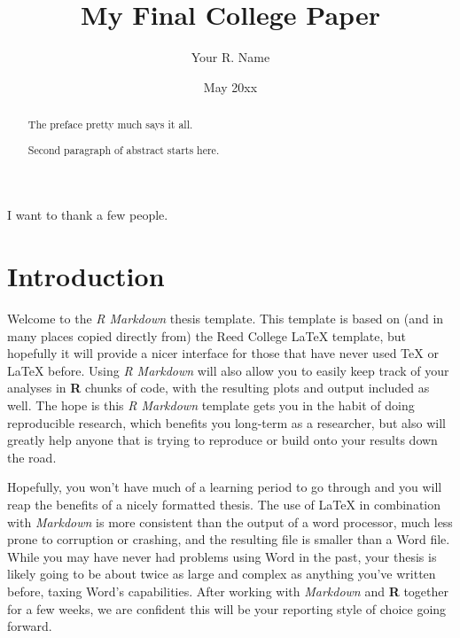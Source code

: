 \documentclass[12pt,phd,a4paper,twoside]{ucl_thesis}
\title{My Final College Paper}
\author{Your R. Name}
\date{May 20xx}
\begin{document}

      \maketitle
  
\makedeclaration
      \begin{abstract}
      The preface pretty much says it all.
      
      \par
      
      Second paragraph of abstract starts here.
    \end{abstract}
      \begin{acknowledgements}
      I want to thank a few people.
    \end{acknowledgements}
      \hypersetup{linkcolor=black}
   \setcounter{tocdepth}{2} 
    \tableofcontents
  
     \listoffigures
  
      \listoftables
  


  \hypertarget{introduction}{%
  \chapter*{Introduction}\label{introduction}}
  
  Welcome to the \emph{R Markdown} thesis template. This template is based on (and in many places copied directly from) the Reed College LaTeX template, but hopefully it will provide a nicer interface for those that have never used TeX or LaTeX before. Using \emph{R Markdown} will also allow you to easily keep track of your analyses in \textbf{R} chunks of code, with the resulting plots and output included as well. The hope is this \emph{R Markdown} template gets you in the habit of doing reproducible research, which benefits you long-term as a researcher, but also will greatly help anyone that is trying to reproduce or build onto your results down the road.
  
  Hopefully, you won't have much of a learning period to go through and you will reap the benefits of a nicely formatted thesis. The use of LaTeX in combination with \emph{Markdown} is more consistent than the output of a word processor, much less prone to corruption or crashing, and the resulting file is smaller than a Word file. While you may have never had problems using Word in the past, your thesis is likely going to be about twice as large and complex as anything you've written before, taxing Word's capabilities. After working with \emph{Markdown} and \textbf{R} together for a few weeks, we are confident this will be your reporting style of choice going forward.
  
\end{document}
